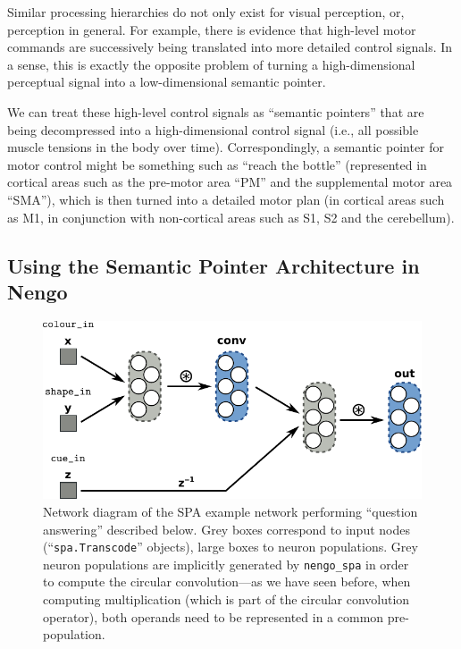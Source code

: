 \documentclass[10pt,letterpaper,oneside]{article}
\begin{document}
Similar processing hierarchies do not only exist for visual perception, or, perception in general. For example, there is evidence that high-level motor commands are successively being translated into more detailed control signals. In a sense, this is exactly the opposite problem of turning a high-dimensional perceptual signal into a low-dimensional semantic pointer. 

We can treat these high-level control signals as \enquote{semantic pointers} that are being decompressed into a high-dimensional control signal (i.e., all possible muscle tensions in the body over time). Correspondingly, a semantic pointer for motor control might be something such as \enquote{reach the bottle} (represented in cortical areas such as the pre-motor area \enquote{PM} and the supplemental motor area \enquote{SMA}), which is then turned into a detailed motor plan (in cortical areas such as M1, in conjunction with non-cortical areas such as S1, S2 and the cerebellum).


\subsection{Using the Semantic Pointer Architecture in Nengo}

\begin{figure}
	\centering
	\includegraphics{media/spa_network.pdf}
	\caption{Network diagram of the SPA example network performing \enquote{question answering} described below. Grey boxes correspond to input nodes (\enquote{\texttt{spa.Transcode}} objects), large boxes to neuron populations. Grey neuron populations are implicitly generated by \texttt{nengo\_spa} in order to compute the circular convolution---as we have seen before, when computing multiplication (which is part of the circular convolution operator), both operands need to be represented in a common pre-population.}
	\label{fig:spa_network}
\end{figure}
\end{document}
